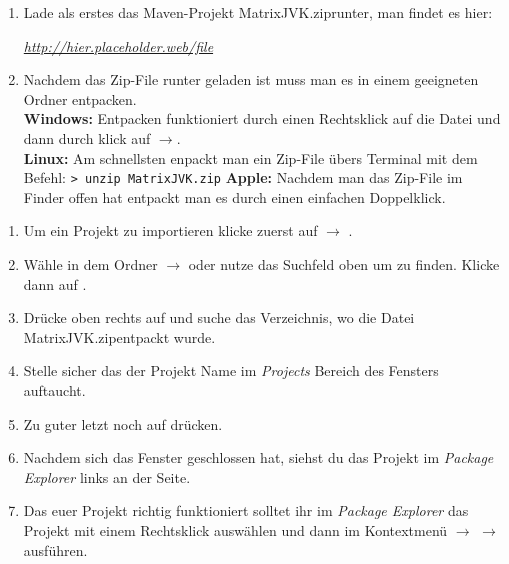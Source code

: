 
\newcommand{\jvkpackage}{MatrixJVK.zip}
\newcommand{\jvkpackageurl}{http://hier.placeholder.web/file}


\begin{Infobox}
    \begin{enumerate}
        \item Lade als erstes das Maven-Projekt \jvkpackage runter, man findet es hier:
        \begin{center}
            \color{blue}\href{\jvkpackageurl}{\textit{\jvkpackageurl}}
        \end{center}

        \item Nachdem das Zip-File runter geladen ist muss man es in einem geeigneten Ordner entpacken.\\
        \textbf{Windows:} Entpacken funktioniert durch einen Rechtsklick auf die Datei und dann durch klick auf $\to$.\\
        \textbf{Linux:} Am schnellsten enpackt man ein Zip-File übers Terminal mit dem Befehl:
        \newline\hspace*{\fill}\texttt{\textgreater\ unzip \jvkpackage}\hspace*{\fill}\newline
        \textbf{Apple:} Nachdem man das Zip-File im Finder offen hat entpackt man es durch einen einfachen Doppelklick.
    \end{enumerate}
\end{Infobox}

\begin{Infobox}
    \begin{enumerate}
        \item Um ein Projekt zu importieren klicke zuerst auf  $\to$ .
        \item Wähle in dem Ordner  $\to$  oder nutze das Suchfeld oben um  zu finden. Klicke dann auf .
        \item Drücke oben rechts auf  und suche das Verzeichnis, wo die Datei \jvkpackage entpackt wurde.
        \item Stelle sicher das der Projekt Name im \textit{Projects} Bereich des Fensters auftaucht.
        \item Zu guter letzt noch auf  drücken.
        \item Nachdem sich das Fenster geschlossen hat, siehst du das Projekt im \textit{Package Explorer} links an der Seite.
        \item Das euer Projekt richtig funktioniert solltet ihr im \textit{Package Explorer} das Projekt mit einem Rechtsklick auswählen und dann im Kontextmenü  $\to$  $\to$  ausführen.
    \end{enumerate}
\end{Infobox}

